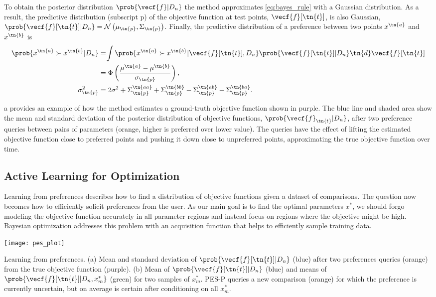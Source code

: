 To obtain the posterior distribution $\prob{\vecf{f}|D_n}$ the method
approximates \cref{eq:bayes_rule} with a Gaussian distribution. As a result, the
predictive distribution (subscript p) of the objective function at test points,
$\vecf{f}[\tn{t}]$, is also Gaussian, $\prob{\vecf{f}[\tn{t}] | D_n} =
\mathcal{N} \left( \mu_\tn{p}, \Sigma_\tn{p} \right)$. Finally, the predictive
distribution of a preference between two points $x^\tn{a}$ and $x^\tn{b}$ is 
\begin{align} 
    \prob{x^\tn{a} \succ x^\tn{b} |D_n} 
    &=\hspace{-2pt}\int \prob{x^\tn{a} \succ x^\tn{b}|\vecf{f}[\tn{t}],D_n}
    \prob{\vecf{f}[\tn{t}]| D_n} \tn{d} \vecf{f}[\tn{t}] 
        \label{eq:prob_of_pref}\\
    &= \Phi \left(\frac{\mu^\tn{a} - \mu^\tn{b}}{\sigma_\tn{p}} \right),
        \label{eq:p_pref} \\ 
    \sigma_\tn{p}^2 &= 2\sigma^2 + \Sigma_\tn{p}^\tn{aa} + \Sigma_\tn{p}^\tn{bb}
        - \Sigma_\tn{p}^\tn{ab} - \Sigma_\tn{p}^\tn{ba}.
\end{align}

a provides an example of how the method estimates a
ground-truth objective function shown in purple. The blue line and shaded area
show the mean and standard deviation of the posterior distribution of objective
functions, $\prob{\vecf{f}_\tn{t}|D_n}$, after two preference queries between
pairs of parameters (orange, higher is preferred over lower value). The queries
have the effect of lifting the estimated objective function close to preferred
points and pushing it down close to unpreferred points, approximating the true
objective function over time.

\subsection{Active Learning for Optimization}
Learning from preferences describes how to find a distribution of objective
functions given a dataset of comparisons. The question now becomes how to
efficiently solicit preferences from the user. As our main goal is to find the
optimal parameters $x^*$, we should forgo modeling the objective function
accurately in all parameter regions and instead focus on regions where the
objective might be high. Bayesian optimization addresses this problem with an
acquisition function that helps to efficiently sample training data.
\begin{marginfigure}
    \centering
    \texttt{[image: pes\_plot]}
    \caption[Learning from preferences with PES-P]{Learning from preferences.
    (a) Mean and standard deviation of $\prob{\vecf{f}[\tn{t}]|D_n}$ (blue)
    after two preferences queries (orange) from the true objective function
    (purple). (b) Mean of $\prob{\vecf{f}[\tn{t}]|D_n}$ (blue) and means of
    $\prob{\vecf{f}[\tn{t}]|D_n, x_m^*}$ (green) for two samples of $x_m^*$.
    PES-P queries a new comparison (orange) for which the preference is
    currently uncertain, but on average is certain after conditioning on all
    $x_m^*$.}\label{fig:pes_plot}
\end{marginfigure}

